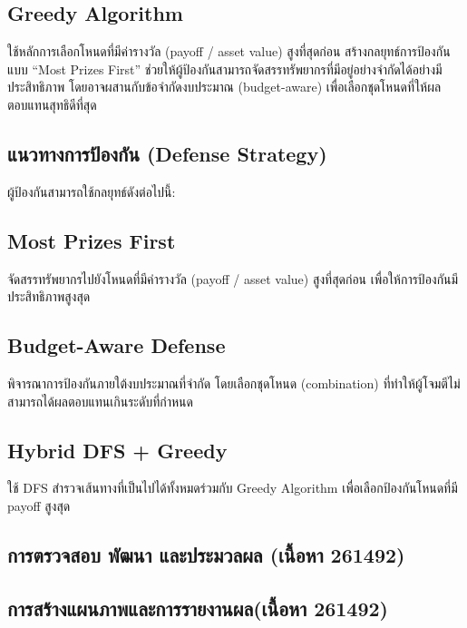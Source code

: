 \subsection{Greedy Algorithm}
ใช้หลักการเลือกโหนดที่มีค่ารางวัล (payoff / asset value) สูงที่สุดก่อน สร้างกลยุทธ์การป้องกันแบบ ``Most Prizes First'' ช่วยให้ผู้ป้องกันสามารถจัดสรรทรัพยากรที่มีอยู่อย่างจำกัดได้อย่างมีประสิทธิภาพ โดยอาจผสานกับข้อจำกัดงบประมาณ (budget-aware) เพื่อเลือกชุดโหนดที่ให้ผลตอบแทนสุทธิดีที่สุด

\subsection{แนวทางการป้องกัน (Defense Strategy)}

ผู้ป้องกันสามารถใช้กลยุทธ์ดังต่อไปนี้:

\subsection{Most Prizes First}
จัดสรรทรัพยากรไปยังโหนดที่มีค่ารางวัล (payoff / asset value) สูงที่สุดก่อน เพื่อให้การป้องกันมีประสิทธิภาพสูงสุด

\subsection{Budget-Aware Defense}
พิจารณาการป้องกันภายใต้งบประมาณที่จำกัด โดยเลือกชุดโหนด (combination) ที่ทำให้ผู้โจมตีไม่สามารถได้ผลตอบแทนเกินระดับที่กำหนด

\subsection{Hybrid DFS + Greedy}
ใช้ DFS สำรวจเส้นทางที่เป็นไปได้ทั้งหมดร่วมกับ Greedy Algorithm เพื่อเลือกป้องกันโหนดที่มี payoff สูงสุด

\subsection{การตรวจสอบ พัฒนา และประมวลผล (เนื้อหา 261492)}


\subsection{การสร้างแผนภาพและการรายงานผล(เนื้อหา 261492)}

